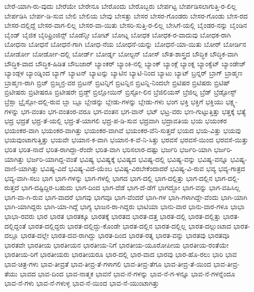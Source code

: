 {ಬೇರೆ-ಯಾಗಿ-ರು-ವುದು
ಬೇರೆಯೇ
ಬೇರೇನೂ
ಬೇರೊಂದು
ಬೇರೊಬ್ಬರು
ಬೇರ್ಪಟ್ಟ
ಬೇರ್ಪಡಿಸಲಾಗುತ್ತಿ-ರ-ಲಿಲ್ಲ
ಬೇರ್ಪಡಿಸಿ
ಬೇರ್ಪ-ಡಿ-ಸುವ
ಬೇಲಿ
ಬೇಲಿಯ
ಬೇವು
ಬೇಸತ್ತು
ಬೇಸರ
ಬೇಸರ-ಗೊಂಡರು
ಬೇಸರ-ಗೊಂಡು
ಬೇಸ-ರದ
ಬೇಸರ-ದಲ್ಲಿದ್ದೆ
ಬೇಸರ-ವಾಗ-ಲಿಲ್ಲ
ಬೇಸರ-ವಾ-ಯಿತು
ಬೇಸರಿ-ಸುತ್ತಿ-ರ-ಲಿಲ್ಲ
ಬೇಸಿಗೆ-ಯಲ್ಲಿ
ಬೈಂಡರ-ನನ್ನು
ಬೈಂಡಿನ
ಬೈಂಡ್
ಬೈಜಿಕ
ಬೈರಿಫ್ರಿಂಜಿನ್ಸ್
ಬೊಡೆನ್ಸೀ
ಬೋಟ್
ಬೋಟ್ನ
ಬೋಧಕ
ಬೋಧಕ-ರ-ವಾದುವು
ಬೋಧಕ-ರಾಗಿ
ಬೋಧನಾ
ಬೋಧನೆ
ಬೋಧನೆ-ಗಾಗಿ
ಬೋಧ-ನೆಯ
ಬೋಧನೆ-ಯನ್ನು
ಬೋಧನೆ-ಯಾ-ಯಿತು
ಬೋರ್
ಬೋರ್ಡಿನ
ಬೋರ್ಡೋ
ಬೋರ್ಡೋ-ದಲ್ಲಿ
ಬೋರ್ಡ್
ಬೋರ್ಡ್ನ
ಬೋಲ್ಟನ್
ಬೋಸ್
ಬೌತ-ಶಾಸ್ತ್ರದ
ಬೌದ್ಧಿಕ
ಬೌದ್ಧಿಕ-ವಾಗಿ
ಬೌದ್ಧಿಕ-ವಾದ
ಬೌದ್ಧಿಕ-ಹಿಡಿತ
ಬೌಬಜಾರ್
ಬ್ಯಾಂಕರ್
ಬ್ಯಾಂಕಿ-ನಲ್ಲಿ
ಬ್ಯಾಂಕ್
ಬ್ಯಾಂಕ್ಗೆ
ಬ್ಯಾಂಕ್ನ
ಬ್ಯಾಂಕ್ವೆಟ್
ಬ್ಯಾಂಡೇಜ್
ಬ್ಯಾಂಡ್ಗಳ
ಬ್ಯಾಂಡ್ನಿಂದ
ಬ್ಯಾಗ್
ಬ್ಯಾಟನ್
ಬ್ಯಾಟನ್ನು
ಬ್ಯಾಟಿನ
ಬ್ಯಾಟಿ-ನಿಂದ
ಬ್ಯಾಟು
ಬ್ಯಾಟ್
ಬ್ರನ್ನರ್
ಬ್ರಾಗ್
ಬ್ರಾಹ್ಮಣ
ಬ್ರಾಹ್ಮಣ-ರಾಗಿ
ಬ್ರಿಜ್
ಬ್ರಿಜ್ಮನ್ರ-ವರ
ಬ್ರಿಟನ್
ಬ್ರಿಟನ್ನಿಗೆ
ಬ್ರಿಟನ್ನಿನ
ಬ್ರಿಟನ್ನಿ-ನಿಂದಲೇ
ಬ್ರಿಟಿಷರ
ಬ್ರಿಟಿಷರು
ಬ್ರಿಟಿಷ್
ಬ್ರಿಟೀಷರು
ಬ್ರಿಟೀಷರೂ
ಬ್ರಿಟೀಷರೇ
ಬ್ರಿಡ್ಜ್
ಬ್ರಿಲ್ಲೋಯಿನ್
ಬ್ರಿಸ್ಟೋ-ಲಿನ
ಬ್ರೆಜಿಲಿಯಸ್
ಬ್ರೆಜಿಲ್ನ
ಬ್ರೆಡ್
ಬ್ರೆಡ್ಟೋಸ್ಟ್
ಬ್ರೆಸ್ಲಾ
ಬ್ರೈಸ್ಗೋ-ದಲ್ಲಿ-ರುವ
ಬ್ಲಾ
ಬ್ಲೂ
ಬ್ಲೇಡನ್ನು
ಬ್ಲೇಡು-ಗಳನ್ನು
ಬ್ಲೇಡು-ಗಳು
ಭಂಗ
ಭಕ್ತಿ
ಭಕ್ತಿಗೆ
ಭಕ್ತಿಯು
ಭಕ್ಷ್ಯ-ಗಳನ್ನು
ಭಗ-ವಂತಂ
ಭಗ-ವಂತಂರ-ವರೂ
ಭಗ-ವಂತನ
ಭಗ-ವಾನ್
ಭಟ್
ಭಟ್ರ-ವರು
ಭಣ-ಗುಟ್ಟುತ್ತಿತ್ತು
ಭತ್ತಕ್ಕೆ
ಭತ್ಯೆ
ಭದ್ರ
ಭದ್ರತೆ
ಭದ್ರ-ತೆ-ಯಲ್ಲಿ
ಭದ್ರ-ತೆ-ಯಾಗಲಿ
ಭದ್ರ-ಪ-ಡಿ-ಸುವ
ಭದ್ರವಾಗಿ
ಭದ್ರಾವತಿಯ
ಭಯ
ಭಯಂಕರ
ಭಯಂಕರ-ವಾಗಿ
ಭಯಂಕರ-ವಾಗಿತ್ತು
ಭಯಂಕರ-ವಾಗಿವೆ
ಭಯಂಕರ-ವೆನಿ-ಸುತ್ತದೆ
ಭಯದ
ಭಯ-ವಿತ್ತು
ಭಯವು
ಭಯವುಂಟಾಗುತ್ತಿತ್ತು
ಭಯವೇ
ಭಯಾನ-ಕ-ವಾಗಿ
ಭಯಾನ-ಕ-ವೆ-ನಿ-ಸಿತ್ತು
ಭರವಸೆ
ಭರವಸೆ-ಯಿಂದ
ಭರವಸೆ-ಯಿತ್ತು
ಭರಿತ
ಭರಿತ-ನಾದೆ
ಭರಿತ-ರಾಗಿದ್ದಾ-ರೆಂದೇ
ಭರಿತ-ವಾಗಿ
ಭರಿಸಲಾರ-ದಷ್ಟು
ಭರ್ಜರಿ
ಭರ್ಜರಿ-ಯಾಗಿ
ಭರ್ಜರಿ-ಯಾಗಿತ್ತು
ಭರ್ಜರಿ-ಯಾಗಿದ್ದ-ವಂತೆ
ಭವಿಷ್ಯ
ಭವಿಷ್ಯಕ್ಕೆ
ಭವಿಷ್ಯದ
ಭವಿಷ್ಯ-ದಲ್ಲಿ
ಭವಿಷ್ಯ-ವನ್ನು
ಭವಿಷ್ಯ-ವನ್ನೂ
ಭವಿಷ್ಯ-ವಾಣಿ-ಯಾಗಿತ್ತು
ಭವಿಷ್ಯ-ವಿದೆ
ಭವಿಷ್ಯ-ವಿದೆ-ಯೆಂಬ
ಭವಿಷ್ಯ-ವಿರಬೇಕೆಂದಾದರೆ
ಭವಿಷ್ಯ-ವಿ-ರುವ
ಭವ್ಯ
ಭವ್ಯ-ಗಾತ್ರದ
ಭವ್ಯ-ವಾಗಿ-ಸಲು
ಭಾಗ
ಭಾಗ-ಗಳನ್ನು
ಭಾಗ-ಗಳಲ್ಲಿ
ಭಾಗದ
ಭಾಗ-ದಲ್ಲಿ
ಭಾಗ-ದಲ್ಲಿತ್ತು
ಭಾಗ-ದಲ್ಲಿನ
ಭಾಗ-ದಲ್ಲಿ-ರುತ್ತದೆ
ಭಾಗ-ದಷ್ಟಿದ್ದಿರ-ಬಹುದು
ಭಾಗ-ದಿಂದ
ಭಾಗ-ದೆಡೆ
ಭಾಗ-ದೆ-ಡೆಗೆ
ಭಾಗದ್ದೋ
ಭಾಗ-ವನ್ನು
ಭಾಗ-ವಹಿಸಿಲ್ಲ
ಭಾಗ-ವಾ-ಗಿ-ರುವ
ಭಾಗ-ವಾದರೆ
ಭಾಗವು
ಭಾಗವೂ
ಭಾಗ-ವೆಂದರೆ
ಭಾಗಿ-ಗಳ
ಭಾಗಿ-ಗಳಾಗಿದ್ದೇ-ವೆಂದು
ಭಾಗಿ-ಯಾಗಿ
ಭಾಗಿ-ಯಾಗಿದ್ದರು
ಭಾಗಿ-ಯಾ-ಗಿದ್ದೆ
ಭಾಗ್ಯ
ಭಾಜನ-ರಾ-ಗಿದ್ದರು
ಭಾಟಿಯಾ
ಭಾನು-ವಾರ
ಭಾನು-ವಾರ-ಗಳೂ
ಭಾಭಾ
ಭಾಭಾ-ರವರು
ಭಾರ
ಭಾರತ
ಭಾರತಕ್ಕೂ
ಭಾರತಕ್ಕೆ
ಭಾರತದ
ಭಾರತ-ದತ್ತ
ಭಾರತ-ದಲ್ಲಿ
ಭಾರತ-ದಲ್ಲಿತ್ತು
ಭಾರತ-ದಲ್ಲಿದ್ದಂತೆ
ಭಾರತ-ದಲ್ಲಿದ್ದರು
ಭಾರತ-ದಲ್ಲಿದ್ದು-ಕೊಂಡೇ
ಭಾರತ-ದಲ್ಲಿನ
ಭಾರತ-ದಲ್ಲಿಲ್ಲ
ಭಾರತ-ದಲ್ಲುಂಟಾದ
ಭಾರತ-ದಲ್ಲೂ
ಭಾರತ-ದಲ್ಲೇ
ಭಾರತ-ದವ-ರಾಗಿದ್ದು
ಭಾರತ-ದಿಂದ
ಭಾರತ-ರತ್ನ
ಭಾರತ-ವನ್ನು
ಭಾರತವು
ಭಾರತವೂ
ಭಾರತವೇ
ಭಾರತೀಯ
ಭಾರತೀಯನ
ಭಾರತೀಯ-ನಿಗೆ
ಭಾರತೀಯ-ಯೂರೋಪೀಯ
ಭಾರತೀಯ-ರಂತೆಯೇ
ಭಾರತೀಯ-ರಿಗೆ
ಭಾರತೀಯರು
ಭಾರತೀಯರೂ
ಭಾರ-ದಲ್ಲಿ
ಭಾರ-ವಾದ
ಭಾರವು
ಭಾರ-ಹೊ-ರಲು
ಭಾರಿ
ಭಾವ
ಭಾವ-ಚಿತ್ರ-ಗಳು
ಭಾವ-ತೀವ್ರತೆ
ಭಾವ-ತೀವ್ರ-ತೆ-ಗಳಾಗಲಿ
ಭಾವ-ತೀವ್ರ-ತೆಗೂ
ಭಾವ-ತೀವ್ರ-ತೆ-ಯಿಂದ
ಭಾವ-ತೀವ್ರ-ತೆಯು
ಭಾವದ
ಭಾವ-ದಿಂದ
ಭಾವ-ನಾತ್ಮಕ
ಭಾವನೆ
ಭಾವ-ನೆ-ಗಳನ್ನು
ಭಾವ-ನೆ-ಗ-ಳನ್ನೂ
ಭಾವ-ನೆ-ಗಳನ್ನೆಂದೂ
ಭಾವ-ನೆ-ಗಳು
ಭಾವ-ನೆ-ಗಳುಳ್ಳ
ಭಾವ-ನೆ-ಯಿಂದ
ಭಾವ-ನೆ-ಯುಂಟಾಗಿತ್ತು
}
